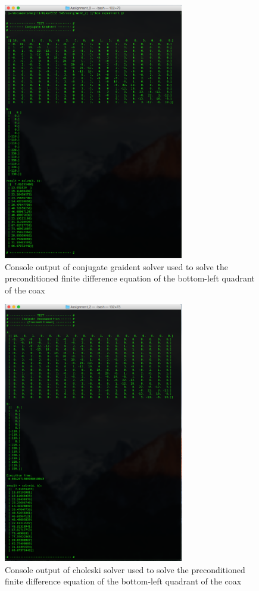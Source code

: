 \documentclass[11pt]{amsart}
\begin{document}
\begin{figure}[h!]
    \includegraphics[width=0.7\textwidth]{assets/q3_cg}
    \caption{Console output of conjugate graident solver used to solve the preconditioned finite difference equation of the bottom-left quadrant of the coax}
    \label{fig:q3_cg}
\end{figure}
\pagebreak
\begin{figure}[h!]
    \includegraphics[width=0.7\textwidth]{assets/q3_chol_II}
    \caption{Console output of choleski solver used to solve the preconditioned finite difference equation of the bottom-left quadrant of the coax}
    \label{fig:q3_chol_II}
\end{figure}
\end{document}
